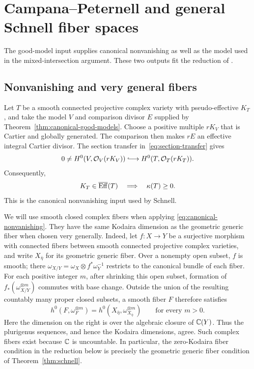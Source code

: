 \section{Campana--Peternell and general Schnell fiber spaces}
\label{sec:general-consequences}

The good-model input supplies canonical nonvanishing as well as the
model used in the mixed-intersection argument. These two outputs fit
the reduction of \cite[Sections~4--10]{Schnell2022}.

\subsection{Nonvanishing and very general fibers}

Let $T$ be a smooth connected projective complex variety with
pseudo-effective $K_T$, and take the model $V$ and comparison divisor
$E$ supplied by Theorem~\ref{thm:canonical-good-models}.
Choose a positive multiple $rK_V$ that is Cartier and globally
generated. The comparison then makes $rE$ an effective integral
Cartier divisor. The section transfer
in~\eqref{eq:section-transfer} gives
\[
 0\ne H^0(V,\cO_V(rK_V))
 \lhook\joinrel\longrightarrow H^0(T,\cO_T(rK_T)).
\]
Consequently,
\begin{equation}\label{eq:canonical-nonvanishing}
 K_T\in\overline{\operatorname{Eff}}(T)\quad\Longrightarrow\quad \kappa(T)\geq0.
\end{equation}
This is the canonical nonvanishing input used by Schnell.

We will use smooth closed complex fibers when applying
\eqref{eq:canonical-nonvanishing}. They have the same Kodaira
dimension as the geometric generic fiber when chosen very generally.
Indeed, let $f\colon X\to Y$ be a surjective morphism with connected
fibers between smooth connected projective complex varieties, and
write $X_{\bar\eta}$ for its geometric generic fiber. Over a nonempty
open subset, $f$ is smooth; there
$\omega_{X/Y}=\omega_X\otimes f^*\omega_Y^{-1}$ restricts to the
canonical bundle of each fiber. For each positive integer $m$, after
shrinking this open subset, formation of
$f_*(\omega_{X/Y}^{\otimes m})$ commutes with base change.
Outside the union of the resulting countably many proper
closed subsets, a smooth fiber $F$ therefore satisfies
\[
 h^0(F,\omega_F^{\otimes m})
 =
 h^0(X_{\bar\eta},\omega_{X_{\bar\eta}}^{\otimes m})
 \qquad\text{for every }m>0.
\]
Here the dimension on the right is over the algebraic closure of
$\mathbb C(Y)$. Thus the plurigenus sequences, and hence the Kodaira
dimensions, agree. Such complex fibers exist because $\mathbb C$ is
uncountable. In particular, the zero-Kodaira fiber condition in the
reduction below is precisely the geometric generic fiber condition
of Theorem~\ref{thm:schnell}.

